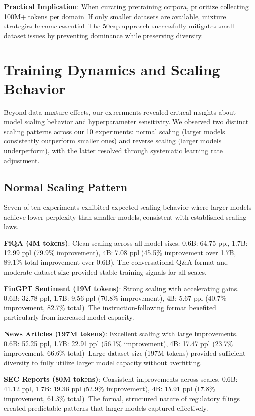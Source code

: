 \textbf{Practical Implication}: When curating pretraining corpora, prioritize collecting 100M+ tokens per domain. If only smaller datasets are available, mixture strategies become essential. The 50cap approach successfully mitigates small dataset issues by preventing dominance while preserving diversity.

\section{Training Dynamics and Scaling Behavior}

Beyond data mixture effects, our experiments revealed critical insights about model scaling behavior and hyperparameter sensitivity. We observed two distinct scaling patterns across our 10 experiments: normal scaling (larger models consistently outperform smaller ones) and reverse scaling (larger models underperform), with the latter resolved through systematic learning rate adjustment.

\subsection{Normal Scaling Pattern}

Seven of ten experiments exhibited expected scaling behavior where larger models achieve lower perplexity than smaller models, consistent with established scaling laws.

\textbf{FiQA (4M tokens)}: Clean scaling across all model sizes. 0.6B: 64.75 ppl, 1.7B: 12.99 ppl (79.9\% improvement), 4B: 7.08 ppl (45.5\% improvement over 1.7B, 89.1\% total improvement over 0.6B). The conversational Q\&A format and moderate dataset size provided stable training signals for all scales.

\textbf{FinGPT Sentiment (19M tokens)}: Strong scaling with accelerating gains. 0.6B: 32.78 ppl, 1.7B: 9.56 ppl (70.8\% improvement), 4B: 5.67 ppl (40.7\% improvement, 82.7\% total). The instruction-following format benefited particularly from increased model capacity.

\textbf{News Articles (197M tokens)}: Excellent scaling with large improvements. 0.6B: 52.25 ppl, 1.7B: 22.91 ppl (56.1\% improvement), 4B: 17.47 ppl (23.7\% improvement, 66.6\% total). Large dataset size (197M tokens) provided sufficient diversity to fully utilize larger model capacity without overfitting.

\textbf{SEC Reports (80M tokens)}: Consistent improvements across scales. 0.6B: 41.12 ppl, 1.7B: 19.36 ppl (52.9\% improvement), 4B: 15.91 ppl (17.8\% improvement, 61.3\% total). The formal, structured nature of regulatory filings created predictable patterns that larger models captured effectively.


